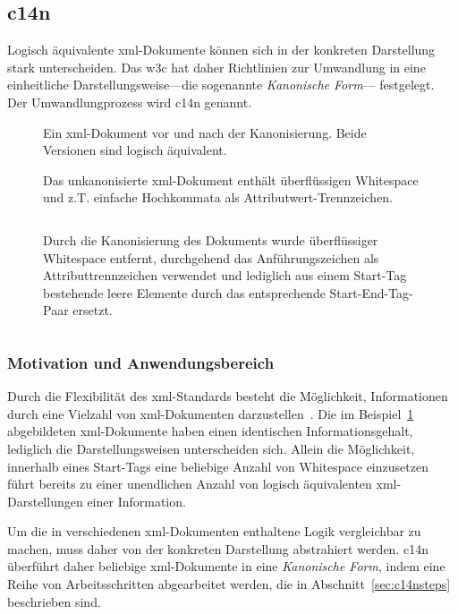 \subsection{\acrfull{c14n}}
\label{sec:c14n}

Logisch äquivalente \acrshort{xml}-Dokumente können sich in der konkreten Darstellung
stark unterscheiden. Das \gls{w3c} hat daher Richtlinien zur Umwandlung in eine
einheitliche Darstellungsweise---die sogenannte \emph{Kanonische Form}---
festgelegt. Der Umwandlungprozess wird \acrfull{c14n} genannt.~\cite{c14n}

\begin{figure}[h!]
\begin{example}[Kanonisierung]
    \label{ex:c14n}
    Ein \acrshort{xml}-Dokument vor und nach der Kanonisierung. Beide Versionen sind
    logisch äquivalent.

    Das unkanonisierte \acrshort{xml}-Dokument enthält überflüssigen Whitespace und z.T. einfache Hochkommata als Attributwert-Trennzeichen.
    \inputminted{xml}{ex-c14n-pre.xml}
    Durch die Kanonisierung des Dokuments wurde überflüssiger Whitespace entfernt, durchgehend das Anführungszeichen als Attributtrennzeichen verwendet und lediglich aus einem Start-Tag bestehende leere Elemente durch das entsprechende Start-End-Tag-Paar ersetzt.
    \inputminted{xml}{ex-c14n-post.xml}
\end{example}
\end{figure}

\subsubsection{Motivation und Anwendungsbereich}
\label{sec:c14nscope}

Durch die Flexibilität des \acrshort{xml}-Standards besteht die Möglichkeit, Informationen durch eine Vielzahl von \acrshort{xml}-Dokumenten darzustellen~\cite{siddiqui2002c14n}. Die im Beispiel~\ref{ex:c14n} abgebildeten \acrshort{xml}-Dokumente haben einen identischen Informationsgehalt, lediglich die Darstellungsweisen unterscheiden sich. Allein die Möglichkeit, innerhalb eines Start-Tags eine beliebige Anzahl von Whitespace einzusetzen~\cite[Produktionsregeln 3 und 40]{xml} führt bereits zu einer unendlichen Anzahl von logisch äquivalenten \acrshort{xml}-Darstellungen einer Information.

Um die in verschiedenen \acrshort{xml}-Dokumenten enthaltene Logik vergleichbar zu machen, muss daher von der konkreten Darstellung abstrahiert werden. \acrlong{c14n} überführt daher beliebige \acrshort{xml}-Dokumente in eine \emph{Kanonische Form}, indem eine Reihe von Arbeitsschritten abgearbeitet werden, die in Abschnitt~\ref{sec:c14nsteps} beschrieben sind.

